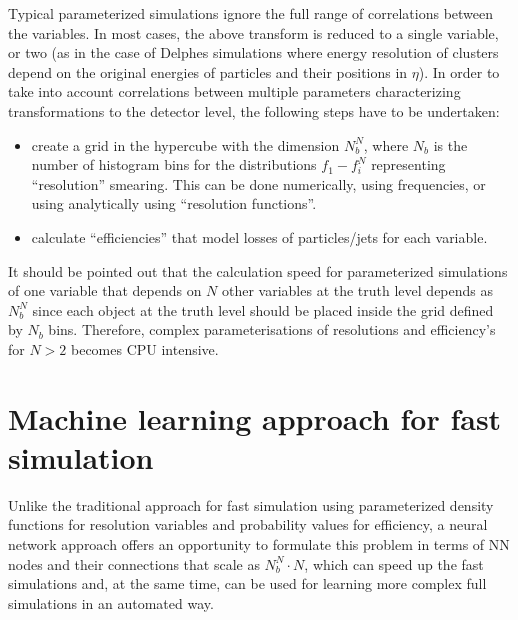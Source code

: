 \documentclass[showpacs,showkeys,preprint,prd,nofootinbib,linenumbers,12pt]{revtex4-1}
\begin{document}
Typical parameterized simulations ignore the full range of correlations between the variables. In most cases, the above transform is reduced to a single variable, or two (as in the case of Delphes simulations where energy resolution of clusters depend on the original energies of particles and their positions in $\eta$). In order to take into account correlations between  multiple parameters characterizing transformations to the detector level, the following steps have to be undertaken:

\begin{itemize}

\item
  create a grid in the hypercube with the dimension $N_b^N$, where $N_b$ is the number of histogram bins for the distributions $f_1-f_i^N$  representing ``resolution'' smearing. This can be done numerically, using frequencies, or using analytically using ``resolution functions''.

\item
  calculate ``efficiencies'' that model losses of particles/jets for each variable.

\end{itemize}

It should be pointed out that the calculation speed for parameterized simulations of one variable that depends on $N$ other variables at the truth level depends  as $N_b^N$ since each object at the truth level should be placed inside the grid defined by $N_b$ bins. Therefore, complex parameterisations of resolutions and efficiency's for $N>2$ becomes CPU intensive. 

\section{Machine learning approach for fast simulation}

Unlike the traditional approach for fast simulation using parameterized density functions for resolution variables and probability values for efficiency, a neural network approach offers an opportunity to formulate this problem in terms of NN nodes and their connections that scale as $N_b^N \cdot N$, which can speed up the fast simulations and, at the same time, can be used for learning more complex full simulations in an automated way.
\end{document}
